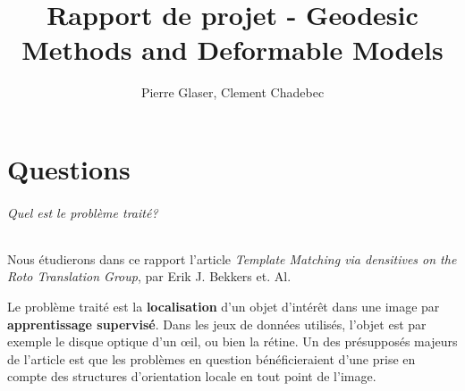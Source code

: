 \documentclass{article}
\author{Pierre Glaser, Clement Chadebec}
\title{Rapport de projet - Geodesic Methods and Deformable Models}
\begin{document}
\maketitle
\pagebreak
\part*{Questions}


\paragraph{Quel est le problème traité?} 
Nous étudierons dans ce rapport l'article \emph{Template Matching via densitives on the
Roto Translation Group}, par Erik J. Bekkers et. Al. \cite{main}

Le problème traité est la \textbf{localisation} d'un objet d'intérêt dans une image par
\textbf{apprentissage supervisé}. Dans les jeux de
données utilisés, l'objet est par exemple le disque optique d'un œil, ou bien la
rétine. Un des présupposés majeurs de l'article est que les problèmes en question bénéficieraient d'une prise en
compte des structures d'orientation locale en tout point de l'image.
\end{document}
